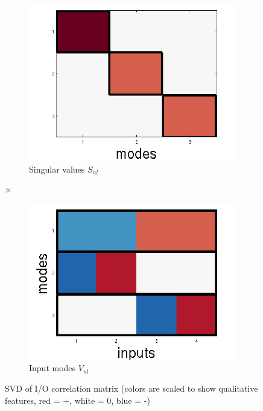 \documentclass[10pt,letterpaper]{article}
\begin{document}
\begin{figure}
\begin{subfigure}{0.22\textwidth}
\includegraphics[width=\textwidth]{figures/S_nl.png}
\caption{Singular values $S_{nl}$}
\end{subfigure}
\LARGE{$\times$}
\begin{subfigure}{0.22\textwidth}
\includegraphics[width=\textwidth]{figures/V_nl.png}
\caption{Input modes $V_{nl}$}
\end{subfigure}
\caption{SVD of I/O correlation matrix (colors are scaled to show qualitative features, red = +, white = 0, blue = -)}
\label{regular_SVD_figure}
\end{figure}
\end{document}
